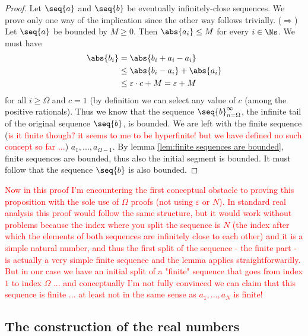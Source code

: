 {
\begin{proof}
    Let $\seq{a}$ and $\seq{b}$ be eventually infinitely-close sequences. We prove only one way of the implication since the other way follows trivially. ($\Rightarrow$) Let $\seq{a}$ be bounded by $M\geq 0$. Then $\abs{a_i} \leq M$ for every $i \in \Ns$. We must have
    \begin{align*}
        \abs{b_i} & = \abs{b_i +a_i - a_i} \\
        & \leq \abs{b_i-a_i} +\abs{a_i} \\
        & \leq \varepsilon \cdot c + M = \varepsilon + M
    \end{align*}
    for all $i \geq \Omega$ and $c=1$ (by definition we can select any value of $c$ (among the positive rationals). Thus we know that the sequence $\seq{b}_{n=\Omega}^\infty$, the infinite tail of the original sequence $\seq{b}$, is bounded. We are left with the finite sequence (\textcolor{red}{is it finite though? it seems to me to be hyperfinite! but we have defined no such concept so far ...}) $a_1, ..., a_{\Omega-1}$. By lemma \ref{lem:finite sequences are bounded}, finite sequences are bounded, thus also the initial segment is bounded. It must follow that the sequence $\seq{b}$ is also bounded.
\end{proof}
\textcolor{red}{Now in this proof I'm encountering the first conceptual obstacle to proving this proposition with the sole use of $\Omega$ proofs (not using $\varepsilon$ or $N$). In standard real analysis this proof would follow the same structure, but it would work without problems because the index where you split the sequence is $N$ (the index after which the elements of both sequences are infinitely close to each other) and it is a simple natural number, and thus the first split of the sequence - the finite part - is actually a very simple finite sequence and the lemma applies straightforwardly. But in our case we have an initial split of a "finite" sequence that goes from index $1$ to index $\Omega$ ... and conceptually I'm not fully convinced we can claim that this sequence is finite ... at least not in the same sense as $a_1, ..., a_N$ is finite!}

\subsection{The construction of the real numbers}

}
